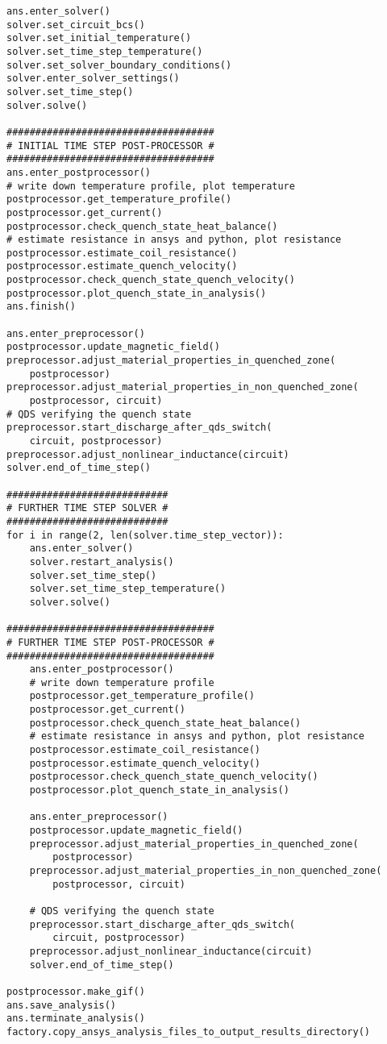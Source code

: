 \begin{verbatim}
ans.enter_solver()
solver.set_circuit_bcs()
solver.set_initial_temperature()
solver.set_time_step_temperature()
solver.set_solver_boundary_conditions()
solver.enter_solver_settings()
solver.set_time_step()
solver.solve()

####################################
# INITIAL TIME STEP POST-PROCESSOR #
####################################
ans.enter_postprocessor()
# write down temperature profile, plot temperature
postprocessor.get_temperature_profile()      
postprocessor.get_current()
postprocessor.check_quench_state_heat_balance()
# estimate resistance in ansys and python, plot resistance
postprocessor.estimate_coil_resistance()     
postprocessor.estimate_quench_velocity()
postprocessor.check_quench_state_quench_velocity()
postprocessor.plot_quench_state_in_analysis()
ans.finish()

ans.enter_preprocessor()
postprocessor.update_magnetic_field()
preprocessor.adjust_material_properties_in_quenched_zone(
    postprocessor)
preprocessor.adjust_material_properties_in_non_quenched_zone(
    postprocessor, circuit)
# QDS verifying the quench state
preprocessor.start_discharge_after_qds_switch(
    circuit, postprocessor)
preprocessor.adjust_nonlinear_inductance(circuit)
solver.end_of_time_step()

############################
# FURTHER TIME STEP SOLVER #
############################
for i in range(2, len(solver.time_step_vector)):
    ans.enter_solver()
    solver.restart_analysis()
    solver.set_time_step()
    solver.set_time_step_temperature()
    solver.solve()

####################################
# FURTHER TIME STEP POST-PROCESSOR #
####################################
    ans.enter_postprocessor()
    # write down temperature profile
    postprocessor.get_temperature_profile()    
    postprocessor.get_current()
    postprocessor.check_quench_state_heat_balance()
    # estimate resistance in ansys and python, plot resistance
    postprocessor.estimate_coil_resistance()  
    postprocessor.estimate_quench_velocity()
    postprocessor.check_quench_state_quench_velocity()
    postprocessor.plot_quench_state_in_analysis()

    ans.enter_preprocessor()
    postprocessor.update_magnetic_field()
    preprocessor.adjust_material_properties_in_quenched_zone(
        postprocessor)
    preprocessor.adjust_material_properties_in_non_quenched_zone(
        postprocessor, circuit)

    # QDS verifying the quench state
    preprocessor.start_discharge_after_qds_switch(
        circuit, postprocessor)
    preprocessor.adjust_nonlinear_inductance(circuit)
    solver.end_of_time_step()

postprocessor.make_gif()
ans.save_analysis()
ans.terminate_analysis()
factory.copy_ansys_analysis_files_to_output_results_directory()
    
\end{verbatim}